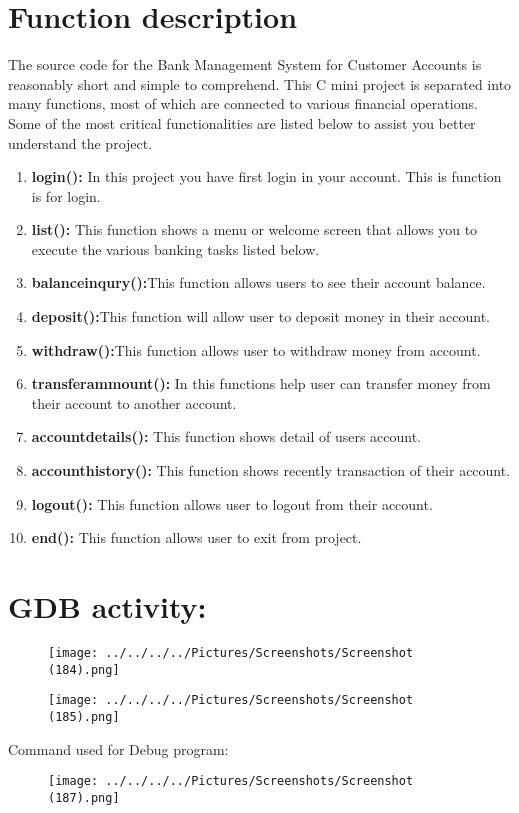 \documentclass[12pt,a4 paper]{article}
\begin{document}
\section{Function description}
The source code for the Bank Management System for Customer Accounts is reasonably short and simple to comprehend. This C mini project is separated into many functions, most of which are connected to various financial operations. Some of the most critical functionalities are listed below to assist you better understand the project.
\begin{enumerate}
\item \textbf{login():} In this project you have first login in your account. This is function is for login.
\item\textbf{list():} This function shows a menu or welcome screen that allows you to execute the various banking tasks listed below.
\item\textbf{balanceinqury():}This function allows users to see their account balance.
\item\textbf{deposit():}This function will allow user to deposit money in their account.
\item\textbf{withdraw():}This function allows user to withdraw money from account.
\item\textbf{transferammount():} In this functions help user can transfer money from their account to another account.
\item\textbf{accountdetails():} This function shows detail of users account.
\item\textbf{accounthistory():} This function shows recently transaction of their account.
\item\textbf{logout():} This function allows user to logout from their account.\\
\item\textbf{end():} This function allows user to exit from project.\\
\end{enumerate}
\newpage
\section{GDB activity:} 
\begin{figure}
\texttt{[image: ../../../../Pictures/Screenshots/Screenshot (184).png]} 
\caption{}
\end{figure}
\begin{figure}
\texttt{[image: ../../../../Pictures/Screenshots/Screenshot (185).png]} 
\caption{}
\end{figure}
Command used for Debug program:
\begin{figure}
\texttt{[image: ../../../../Pictures/Screenshots/Screenshot (187).png]} 
\caption{}
\end{figure}
\newpage
\end{document}

